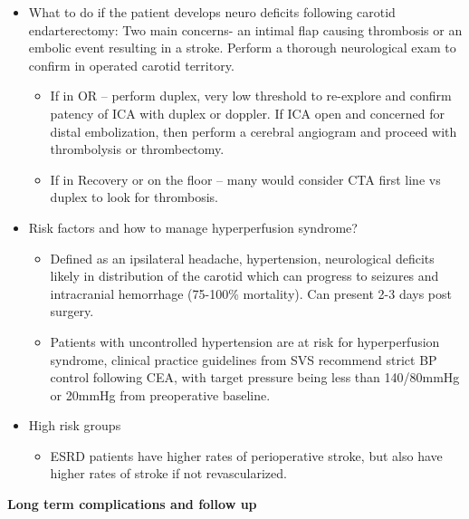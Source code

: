 \documentclass[
]{book}
\providecommand{\tightlist}{%
  \setlength{\itemsep}{0pt}\setlength{\parskip}{0pt}}
\begin{document}
\begin{itemize}
\item
  What to do if the patient develops neuro deficits following carotid
  endarterectomy: Two main concerns- an intimal flap causing
  thrombosis or an embolic event resulting in a stroke. Perform a
  thorough neurological exam to confirm in operated carotid territory.

  \begin{itemize}
  \item
    If in OR -- perform duplex, very low threshold to re-explore and
    confirm patency of ICA with duplex or doppler. If ICA open and
    concerned for distal embolization, then perform a cerebral
    angiogram and proceed with thrombolysis or
    thrombectomy.\citep{fletcher2016}
  \item
    If in Recovery or on the floor -- many would consider CTA first
    line vs duplex to look for thrombosis.
  \end{itemize}
\item
  Risk factors and how to manage hyperperfusion syndrome?

  \begin{itemize}
  \item
    Defined as an ipsilateral headache, hypertension, neurological
    deficits likely in distribution of the carotid which can
    progress to seizures and intracranial hemorrhage (75-100\%
    mortality). Can present 2-3 days post surgery.\citep{kaku2004}
  \item
    Patients with uncontrolled hypertension are at risk for
    hyperperfusion syndrome, clinical practice guidelines from SVS
    recommend strict BP control following CEA, with target pressure
    being less than 140/80mmHg or 20mmHg from preoperative
    baseline.\citep{abou-chebl2004}
  \end{itemize}
\item
  High risk groups

  \begin{itemize}
  \tightlist
  \item
    ESRD patients have higher rates of perioperative stroke, but
    also have higher rates of stroke if not revascularized.
    \citep{klarinPerioperativeLongtermImpact2016}
  \end{itemize}
\end{itemize}

\textbf{Long term complications and follow up}
\end{document}
